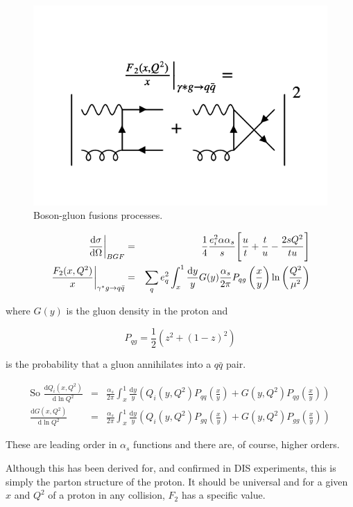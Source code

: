 \begin{figure}[!htb]
  \begin{center}
    \includegraphics[width=\textwidth]{images/web_feynman/image_76.png}
    \caption[Boson-gluon fusions processes]{Boson-gluon fusions processes.}
    \label{fig:ch14_BGF}
  \end{center}
\end{figure}

\begin{eqnarray*}
  \left.\frac{\mathrm{d}\sigma}{\mathrm{d}\Omega}\right|_{BGF} & = & \frac{1}{4}\frac{e_i^2\alpha\alpha_s}{s}\Bigg[\frac{u}{t} + \frac{t}{u} - \frac{2sQ^2}{tu}\Bigg] \\
  \left.\frac{F_2(x,Q^2)}{x}\right|_{\gamma^{\star}g \to q\bar{q}} & = & \sum_q e_q^2 \int_x^1 \frac{\mathrm{d}y}{y}G(y)\frac{\alpha_s}{2\pi}P_{qg}\left(\frac{x}{y}\right)\ln\left(\frac{Q^2}{\mu^2}\right)
\end{eqnarray*}

where $G(y)$ is the gluon density in the proton and

\[
  P_{qg} = \frac{1}{2}\left(z^2 + (1 - z)^2\right)
\]

is the probability that a gluon annihilates into a $q\bar{q}$ pair.

\begin{eqnarray*}
  \textrm{So } \frac{\mathrm{d}Q_i(x,Q^2)}{\mathrm{d}\ln Q^2} & = & \frac{\alpha_s}{2 \pi}\int_x^1 \frac{\mathrm{d}y}{y}\left(Q_i(y,Q^2)P_{qq}\left(\frac{x}{y}\right) + G(y,Q^2)P_{qg}\left(\frac{x}{y}\right)\right) \\
  \frac{\mathrm{d}G(x,Q^2)}{\mathrm{d}\ln Q^2} & = & \frac{\alpha_s}{2\pi}\int_x^1\frac{\mathrm{d}y}{y}\left(Q_i(y,Q^2)P_{gq}\left(\frac{x}{y}\right) + G(y,Q^2)P_{gg}\left(\frac{x}{y}\right)\right)
\end{eqnarray*}

These are leading order in $\alpha_s$ functions and there are, of course, higher orders.

Although this has been derived for, and confirmed in DIS experiments, this is simply the parton structure of the proton.  It should be universal and for a given $x$ and $Q^2$ of a proton in any collision, $F_2$ has a specific value.
